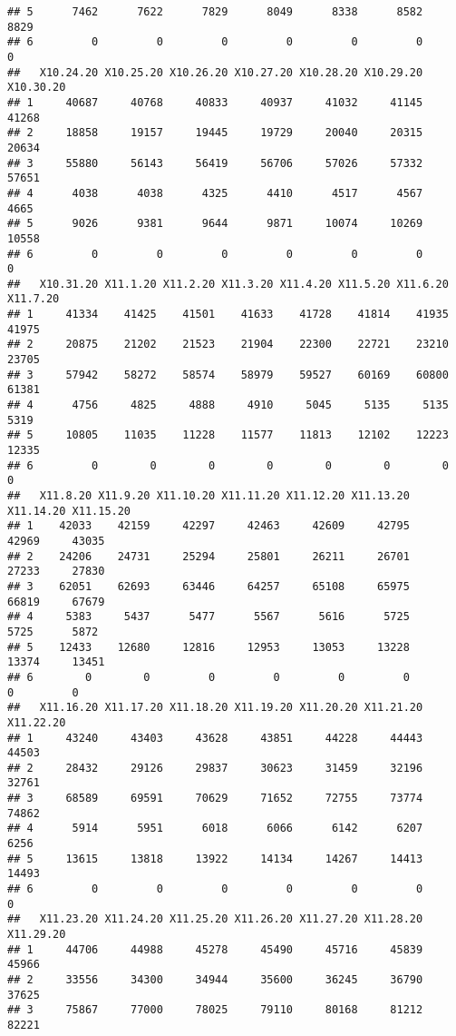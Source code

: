 \documentclass[
]{article}
\begin{document}
\begin{verbatim}
## 5      7462      7622      7829      8049      8338      8582      8829
## 6         0         0         0         0         0         0         0
##   X10.24.20 X10.25.20 X10.26.20 X10.27.20 X10.28.20 X10.29.20 X10.30.20
## 1     40687     40768     40833     40937     41032     41145     41268
## 2     18858     19157     19445     19729     20040     20315     20634
## 3     55880     56143     56419     56706     57026     57332     57651
## 4      4038      4038      4325      4410      4517      4567      4665
## 5      9026      9381      9644      9871     10074     10269     10558
## 6         0         0         0         0         0         0         0
##   X10.31.20 X11.1.20 X11.2.20 X11.3.20 X11.4.20 X11.5.20 X11.6.20 X11.7.20
## 1     41334    41425    41501    41633    41728    41814    41935    41975
## 2     20875    21202    21523    21904    22300    22721    23210    23705
## 3     57942    58272    58574    58979    59527    60169    60800    61381
## 4      4756     4825     4888     4910     5045     5135     5135     5319
## 5     10805    11035    11228    11577    11813    12102    12223    12335
## 6         0        0        0        0        0        0        0        0
##   X11.8.20 X11.9.20 X11.10.20 X11.11.20 X11.12.20 X11.13.20 X11.14.20 X11.15.20
## 1    42033    42159     42297     42463     42609     42795     42969     43035
## 2    24206    24731     25294     25801     26211     26701     27233     27830
## 3    62051    62693     63446     64257     65108     65975     66819     67679
## 4     5383     5437      5477      5567      5616      5725      5725      5872
## 5    12433    12680     12816     12953     13053     13228     13374     13451
## 6        0        0         0         0         0         0         0         0
##   X11.16.20 X11.17.20 X11.18.20 X11.19.20 X11.20.20 X11.21.20 X11.22.20
## 1     43240     43403     43628     43851     44228     44443     44503
## 2     28432     29126     29837     30623     31459     32196     32761
## 3     68589     69591     70629     71652     72755     73774     74862
## 4      5914      5951      6018      6066      6142      6207      6256
## 5     13615     13818     13922     14134     14267     14413     14493
## 6         0         0         0         0         0         0         0
##   X11.23.20 X11.24.20 X11.25.20 X11.26.20 X11.27.20 X11.28.20 X11.29.20
## 1     44706     44988     45278     45490     45716     45839     45966
## 2     33556     34300     34944     35600     36245     36790     37625
## 3     75867     77000     78025     79110     80168     81212     82221

\end{verbatim}
\end{document}
